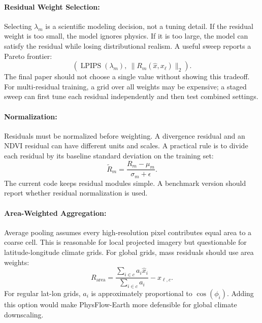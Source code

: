 \documentclass{article}
\begin{document}
\paragraph{Residual Weight Selection:}

Selecting $\lambda_m$ is a scientific modeling decision, not a tuning detail. If the residual weight is too small, the model ignores physics. If it is too large, the model can satisfy the residual while losing distributional realism. A useful sweep reports a Pareto frontier:
\begin{equation}
  \left(\operatorname{LPIPS}(\lambda_m),\ \|R_m(\hat{x},x_{\ell})\|_2\right).
\end{equation}
The final paper should not choose a single value without showing this tradeoff. For multi-residual training, a grid over all weights may be expensive; a staged sweep can first tune each residual independently and then test combined settings.

\paragraph{Normalization:}

Residuals must be normalized before weighting. A divergence residual and an NDVI residual can have different units and scales. A practical rule is to divide each residual by its baseline standard deviation on the training set:
\begin{equation}
  \tilde{R}_m=\frac{R_m-\mu_m}{\sigma_m+\epsilon}.
\end{equation}
The current code keeps residual modules simple. A benchmark version should report whether residual normalization is used.

\paragraph{Area-Weighted Aggregation:}

Average pooling assumes every high-resolution pixel contributes equal area to a coarse cell. This is reasonable for local projected imagery but questionable for latitude-longitude climate grids. For global grids, mass residuals should use area weights:
\begin{equation}
  R_{\text{area}} = \frac{\sum_{i\in c} a_i\hat{x}_i}{\sum_{i\in c}a_i}-x_{\ell,c}.
\end{equation}
For regular lat-lon grids, $a_i$ is approximately proportional to $\cos(\phi_i)$. Adding this option would make PhysFlow-Earth more defensible for global climate downscaling.
\end{document}
